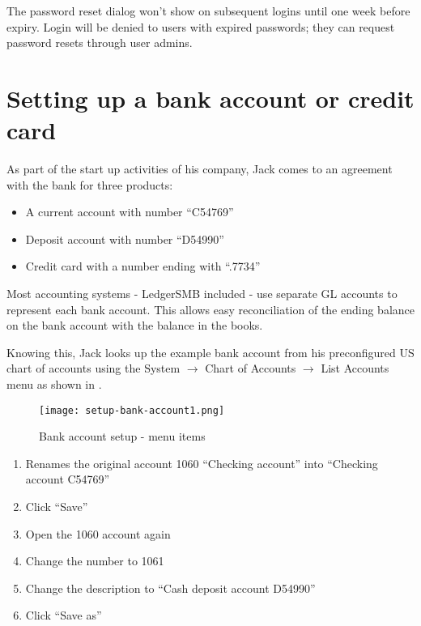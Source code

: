The password reset dialog won't show on subsequent logins until one week
before expiry. Login will be denied to users with expired passwords; they can request
password resets through user admins.


\section{Setting up a bank account or credit card}
\label{sec-first-login-setup-bank-account}

As part of the start up activities of his company, Jack comes to an agreement with the
bank for three products:

\begin{itemize}
\item A current account with number ``C54769''
\item Deposit account with number ``D54990''
\item Credit card with a number ending with ``.7734''
\end{itemize}

Most accounting systems - LedgerSMB included - use separate GL accounts to represent
each bank account. This allows easy reconciliation of the ending balance on the bank
account with the balance in the books.

Knowing this, Jack looks up the example bank account from his preconfigured US chart of
accounts using the System $\rightarrow$ Chart of Accounts $\rightarrow$ List Accounts menu as
shown in .

\begin{figure}[h]
\texttt{[image: setup-bank-account1.png]}
\caption{Bank account setup - menu items}
\label{fig:bank-setup1}
\end{figure}



\begin{enumerate}
\item Renames the original account 1060 ``Checking account'' into ``Checking account C54769''
\item Click ``Save''
\item Open the 1060 account again
\label{itm:bank-setup-steps-start}
\item Change the number to 1061
\item Change the description to ``Cash deposit account D54990''
\item Click ``Save as''
\label{itm:bank-setup-steps-end}
\end{enumerate}

